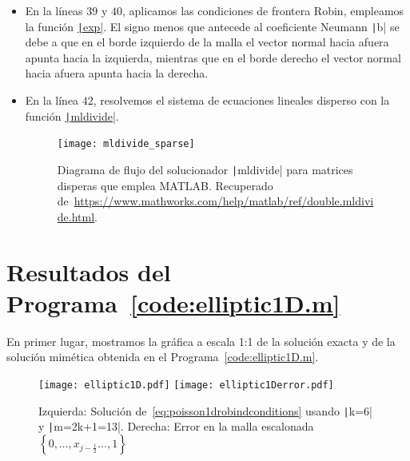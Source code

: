 \begin{itemize}
    \item

          En la líneas $39$ y $40$, aplicamos las condiciones de
          frontera Robin, empleamos la función
          \href{https://docs.octave.org/latest/Exponents-and-Logarithms.html#XREFexp}{\texttt|exp|}.
          El signo menos que antecede al coeficiente Neumann
          \texttt|b| se debe a que en el borde izquierdo
          de la malla el vector normal hacia afuera apunta hacia la
          izquierda, mientras que en el borde derecho el vector
          normal hacia afuera apunta hacia la derecha.

    \item

          En la línea $42$, resolvemos el sistema de ecuaciones lineales
          disperso con la función \href{https://docs.octave.org/latest/Arithmetic-Ops.html#index-mldivide}{\texttt|mldivide|}.

          \begin{figure}[ht!]
              \centering
              \texttt{[image: mldivide\_sparse]}
              \caption{Diagrama de flujo del solucionador
                  \texttt|mldivide| para matrices
                  disperas que emplea MATLAB.
                  Recuperado de~\url{https://www.mathworks.com/help/matlab/ref/double.mldivide.html}.}
          \end{figure}
\end{itemize}

\section*{Resultados del Programa~\ref{code:elliptic1D.m}}

En primer lugar, mostramos la gráfica a escala 1:1 de la solución
exacta y de la solución mimética obtenida en el Programa~\ref{code:elliptic1D.m}.

\begin{figure}[ht!]
    \centering
    \texttt{[image: elliptic1D.pdf]}
    \texttt{[image: elliptic1Derror.pdf]}
    \caption{Izquierda: Solución de~\eqref{eq:poisson1drobindconditions}
        usando \texttt|k=6| y \texttt|m=2k+1=13|.
        Derecha: Error en la malla escalonada
        \begin{math}
            \left\{
            0,
            \dotsc,
            x_{j-\frac{1}{2}}
            \dotsc,
            1
            \right\}
        \end{math}}
\end{figure}

